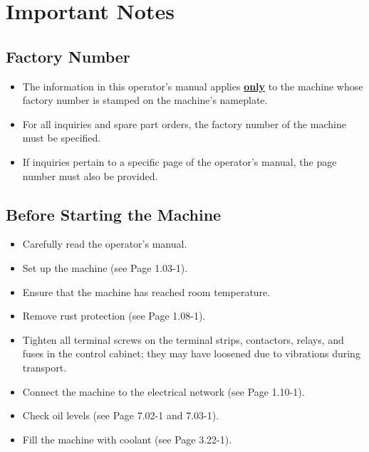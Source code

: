 \section{Important Notes}

\subsection{Factory Number}
\begin{itemize}
    \item The information in this operator's manual applies \uline{\textbf{only}} to the machine whose factory number is stamped on the machine's nameplate.
    \item For all inquiries and spare part orders, the factory number of the machine must be specified.
    \item If inquiries pertain to a specific page of the operator's manual, the page number must also be provided.
\end{itemize}

\subsection{Before Starting the Machine}
\begin{itemize}
    \item Carefully read the operator's manual.
    \item Set up the machine (see Page 1.03-1).
    \item Ensure that the machine has reached room temperature.
    \item Remove rust protection (see Page 1.08-1).
    \item Tighten all terminal screws on the terminal strips, contactors, relays, and fuses in the control cabinet; they may have loosened due to vibrations during transport.
    \item Connect the machine to the electrical network (see Page 1.10-1).
    \item Check oil levels (see Page 7.02-1 and 7.03-1).
    \item Fill the machine with coolant (see Page 3.22-1).
\end{itemize}

